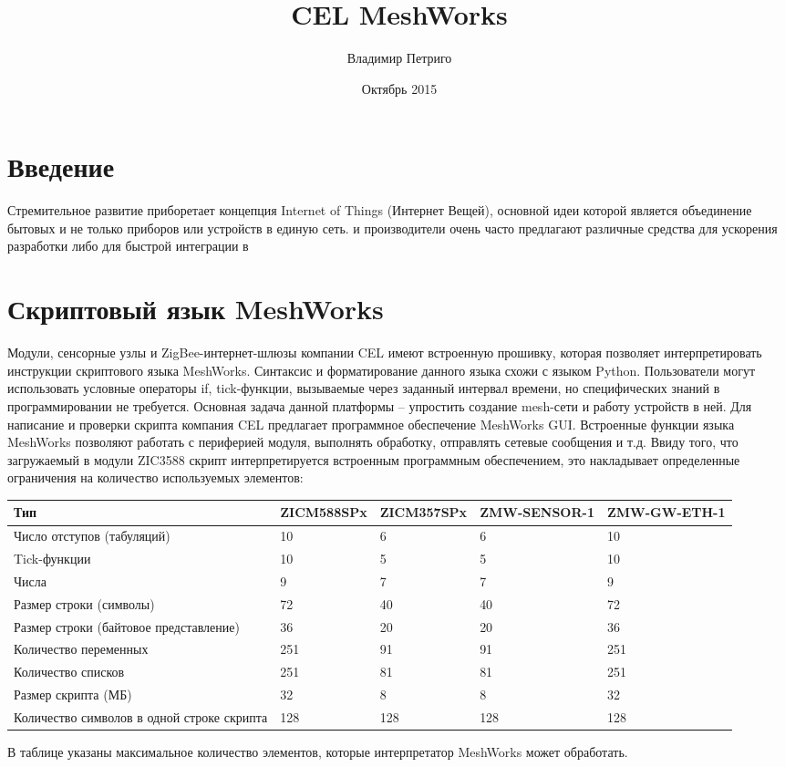 \documentclass[12pt]{article}
\title{CEL MeshWorks}
\author{Владимир Петриго}
\date{Октябрь 2015}
\begin{document}
\maketitle

\section{Введение}

Стремительное развитие приборетает концепция Internet of Things (Интернет Вещей),
основной идеи которой является объединение бытовых и не только приборов или 
устройств в единую сеть. и производители очень часто предлагают различные 
средства для ускорения разработки либо для быстрой интеграции в 

\section{Скриптовый язык MeshWorks}

Модули, сенсорные узлы и ZigBee-интернет-шлюзы компании CEL имеют встроенную 
прошивку, которая позволяет интерпретировать инструкции скриптового языка 
MeshWorks. Синтаксис и форматирование данного языка схожи с языком Python. 
Пользователи могут использовать условные операторы if, tick-функции, вызываемые 
через заданный интервал времени, но специфических знаний в программировании не 
требуется. Основная задача данной платформы – упростить создание mesh-сети и 
работу устройств в ней.
Для написание и проверки скрипта компания CEL предлагает программное обеспечение 
MeshWorks GUI. Встроенные функции языка MeshWorks позволяют работать с периферией 
модуля, выполнять обработку, отправлять сетевые сообщения и т.д.
Ввиду того, что загружаемый в модули ZIC3588 скрипт интерпретируется встроенным 
программным обеспечением, это накладывает определенные ограничения на количество 
используемых элементов:
\begin{center}
\begin{tabular}{ |p{3cm}|p{2cm}|p{2cm}|p{2cm}|p{2cm}| } 
 \hline
 Тип & ZICM588SPx & ZICM357SPx & ZMW-SENSOR-1 & ZMW-GW-ETH-1 \\
 \hline
 Число отступов (табуляций) & 10 & 6 & 6 & 10 \\ 
 Tick-функции & 10 & 5 & 5 & 10 \\ 
 Числа & 9 & 7 & 7 & 9 \\ 
 Размер строки (символы) & 72 & 40 & 40 & 72 \\
 Размер строки (байтовое представление) & 36 & 20 & 20 & 36 \\
 Количество переменных & 251 & 91 & 91 & 251 \\
 Количество списков & 251 & 81 & 81 & 251 \\
 Размер скрипта (МБ) & 32 & 8 & 8 & 32 \\
 Количество символов в одной строке скрипта & 128 & 128 & 128 & 128 \\
 \hline
\end{tabular}
\end{center}
В таблице указаны максимальное количество элементов, которые интерпретатор MeshWorks может обработать.
\end{document}
